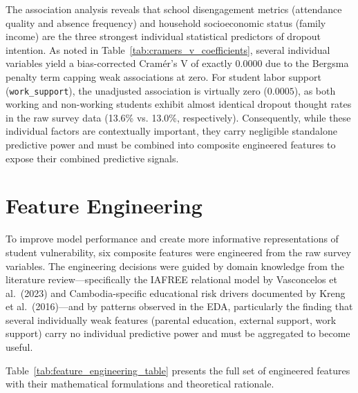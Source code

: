 The association analysis reveals that school disengagement metrics (attendance quality and absence frequency) and household socioeconomic status (family income) are the three strongest individual statistical predictors of dropout intention. As noted in Table~\ref{tab:cramers_v_coefficients}, several individual variables yield a bias-corrected Cram\'{e}r's V of exactly $0.0000$ due to the Bergsma penalty term capping weak associations at zero. For student labor support (\texttt{work\_support}), the unadjusted association is virtually zero ($0.0005$), as both working and non-working students exhibit almost identical dropout thought rates in the raw survey data (13.6\% vs. 13.0\%, respectively). Consequently, while these individual factors are contextually important, they carry negligible standalone predictive power and must be combined into composite engineered features to expose their combined predictive signals.

\section{Feature Engineering}
\label{sec:feature_engineering}

To improve model performance and create more informative representations of student vulnerability, six composite features were engineered from the raw survey variables. The engineering decisions were guided by domain knowledge from the literature review---specifically the IAFREE relational model by Vasconcelos et al.\ (2023) and Cambodia-specific educational risk drivers documented by Kreng et al.\ (2016)---and by patterns observed in the EDA, particularly the finding that several individually weak features (parental education, external support, work support) carry no individual predictive power and must be aggregated to become useful.

Table~\ref{tab:feature_engineering_table} presents the full set of engineered features with their mathematical formulations and theoretical rationale.

